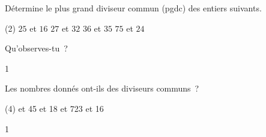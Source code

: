 \documentclass[a4paper,11pt]{report}
\begin{document}
\begin{exo}{
    Détermine le plus grand diviseur commun (pgdc) des entiers suivants.
\begin{tasks}(2)
        \task $25$ et $16$
        \task $27$ et $32$
        \task $36$ et $35$
        \task $75$ et $24$
\end{tasks}
Qu'observes-tu~?
}{1}\end{exo}


\begin{exo}{
    Les nombres donnés ont-ils des diviseurs communs~?
    \begin{tasks}(4)
         et 45 
         et 18 
         et 723 
         et 16
    \end{tasks}
}{1}\end{exo}
\end{document}
